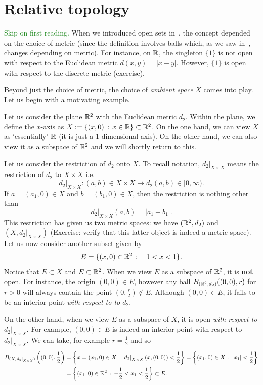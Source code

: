 \section{Relative topology}
\label{sec:rel_top}
\textcolor{ForestGreen}{Skip on first reading.}
When we introduced open sets in~, the concept depended on the choice of metric (since the definition involves balls which, as we saw in~, changes depending on metric). For instance, on $\mathbb{R}$, the singleton $\{1\}$ is not open with respect to the Euclidean metric $d(x,y) = |x-y|$. However, $\{1\}$ is open with respect to the discrete metric (exercise).

Beyond just the choice of metric, the choice of \textit{ambient space} $X$ comes into play. Let us begin with a motivating example.
\begin{eg}
Let us consider the plane $\mathbb{R}^2$ with the Euclidean metric $d_2$. Within the plane, we define the $x$-axis as $X:= \{(x,0)\, :\, x\in \mathbb{R}\}\subset \mathbb{R}^2$. On the one hand, we can view $X$ as `essentially' $\mathbb{R}$ (it is just a 1-dimensional axis). On the other hand, we can also view it as a subspace of $\mathbb{R}^2$ and we will shortly return to this.

Let us consider the restriction of $d_2$ onto $X$. To recall notation, $\left.d_2\right|_{X\times X}$ means the restriction of $d_2$ to $X\times X$ i.e.
\[
\left. d_2\right|_{X\times X}: (a,b) \in X\times X \mapsto d_2(a,b)\in [0,\infty).
\]
If $a=(a_1,0) \in X$ and $b = (b_1,0) \in X$, then the restriction is nothing other than
\[
\left.d_2\right|_{X\times X}(a,b) = |a_1-b_1|.
\]
This restriction has given us two metric spaces: we have $(\mathbb{R}^2,d_2)$ and $(X,\left.d_2\right|_{X\times X})$ (Exercise: verify that this latter object is indeed a metric space).
Let us now consider another subset given by
\[
E = \{(x,0) \in \mathbb{R}^2\, : \, -1 < x < 1\}.
\]
Notice that $E \subset X$ and $E \subset \mathbb{R}^2$. When we view $E$ as a subspace of $\mathbb{R}^2$, it is \textbf{not} open. For instance, the origin $(0,0) \in E$, however any ball $B_{(\mathbb{R}^2,d_2)}((0,0),r)$ for $r>0$ will always contain the point $(0,\frac{r}{2})\notin E$. Although $(0,0)\in E$, it fails to be an interior point \textit{with respect to to $d_2$}.

On the other hand, when we view $E$ as a subspace of $X$, it is open \textit{with respect to $\left.d_2\right|_{X\times X}$}. For example, $(0,0)\in E$ is indeed an interior point with respect to $\left.d_2\right|_{X\times X}$. We can take, for example $r = \frac{1}{2}$ and so
\begin{align*}
B_{(X,\left.d_2\right|_{X\times X})}\left((0,0),\frac{1}{2}\right) &= \left\{
x=(x_1,0)\in X \, : \, \left.d_2\right|_{X\times X}(x,(0,0))<\frac{1}{2}
\right\} = \left\{
(x_1,0)\in X \, : \, |x_1| < \frac{1}{2}
\right\} 	\\
&= \left\{
(x_1,0) \in \mathbb{R}^2 \, : \, -\frac{1}{2}< x_1 < \frac{1}{2}
\right\} \subset E.
\end{align*}
\end{eg}
